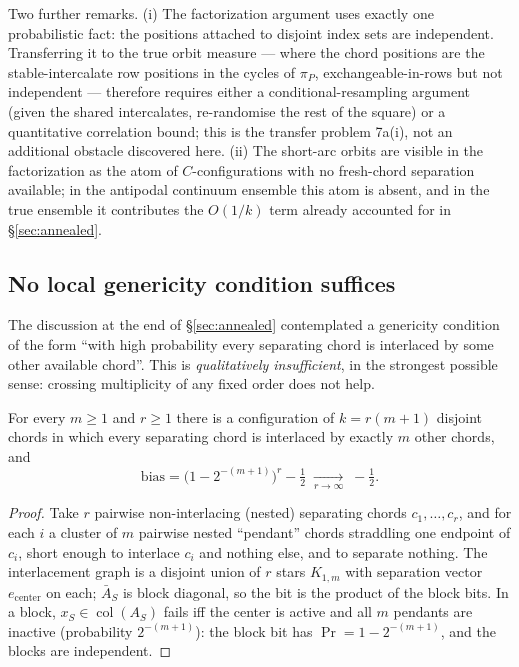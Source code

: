 Two further remarks.  (i) The factorization argument uses exactly
one probabilistic fact: the positions attached to disjoint index
sets are independent.  Transferring it to the true orbit measure ---
where the chord positions are the stable-intercalate row positions
in the cycles of $\pi_P$, exchangeable-in-rows but not independent
--- therefore requires either a conditional-resampling argument
(given the shared intercalates, re-randomise the rest of the square)
or a quantitative correlation bound; this is the transfer problem
7a(i), not an additional obstacle discovered here.  (ii) The
short-arc orbits are visible in the factorization as the atom of
$C$-configurations with no fresh-chord separation available; in the
antipodal continuum ensemble this atom is absent, and in the true
ensemble it contributes the $O(1/k)$ term already accounted for in
\S\ref{sec:annealed}.

\subsection{No local genericity condition suffices}\label{sec:pendant}

The discussion at the end of \S\ref{sec:annealed} contemplated a
genericity condition of the form ``with high probability every
separating chord is interlaced by some other available chord''.
This is \emph{qualitatively insufficient}, in the strongest possible
sense: crossing multiplicity of any fixed order does not help.

\begin{proposition}\label{prop:pendant}
For every $m\ge1$ and $r\ge1$ there is a configuration of
$k=r(m+1)$ disjoint chords in which every separating chord is
interlaced by exactly $m$ other chords, and
\[
\mathrm{bias}
=\bigl(1-2^{-(m+1)}\bigr)^{r}-\tfrac12
\;\xrightarrow[r\to\infty]{}\;-\tfrac12 .
\]
\end{proposition}

\begin{proof}
Take $r$ pairwise non-interlacing (nested) separating chords
$c_1,\dots,c_r$, and for each $i$ a cluster of $m$ pairwise nested
``pendant'' chords straddling one endpoint of $c_i$, short enough to
interlace $c_i$ and nothing else, and to separate nothing.  The
interlacement graph is a disjoint union of $r$ stars $K_{1,m}$ with
separation vector $e_{\mathrm{center}}$ on each; $\bar A_S$ is block
diagonal, so the bit is the product of the block bits.  In a block,
$x_S\in\operatorname{col}(A_S)$ fails iff the center is active and
all $m$ pendants are inactive (probability $2^{-(m+1)}$): the block
bit has $\Pr=1-2^{-(m+1)}$, and the blocks are independent.
\end{proof}

